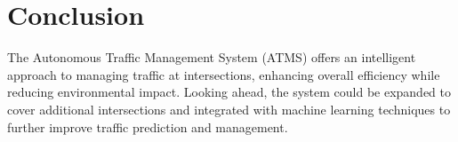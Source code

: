 \documentclass{scrreprt}
\begin{document}
\section*{Conclusion}
The Autonomous Traffic Management System (ATMS) offers an intelligent approach to managing traffic at intersections, enhancing overall efficiency while reducing environmental impact. Looking ahead, the system could be expanded to cover additional intersections and integrated with machine learning techniques to further improve traffic prediction and management.
\end{document}
